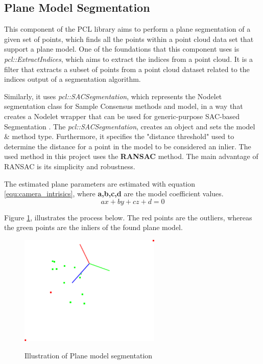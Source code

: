 \documentclass[12pt]{report}
\begin{document}
\subsection{Plane Model Segmentation}
\label{section:Plane Model Segmentation}
This component of the PCL library aims to perform a plane segmentation of a given set of points, which finds all the points within a point cloud data set that support a plane model.
One of the foundations that this component uses is \textit{pcl::ExtractIndices}, which aims to extract the indices from a point cloud.
It is a filter that extracts a subset of points from a point cloud dataset related to the indices output of a segmentation algorithm.

Similarly, it uses \textit{pcl::SACSegmentation}, which represents the Nodelet segmentation class for Sample Consensus methods and model, in a way that creates a Nodelet wrapper that can be used
for generic-purpose SAC-based Segmentation .
The \textit{pcl::SACSegmentation}, creates an object and sets the model \& method type. Furthermore, it specifies the "distance threshold" used to determine the distance for a point in the model to be considered an inlier.
The used method in this project uses the \textbf{RANSAC} method. The main advantage of RANSAC is its simplicity and robustness. 

The estimated plane parameters are estimated with equation \ref{equ:camera_intrisics}, where \textbf{a,b,c,d} are the model coefficient values.
\begin{equation}
  ax + by + cz + d = 0
\end{equation}
\label{equ:plane_param}

Figure \ref{fig:plane_seg}, illustrates the process below. The red points are the outliers, whereas the green points are the inliers of the found plane model.

\begin{figure}[H]%
  \centering
  \includegraphics[width=0.6\textwidth]{planar_segmentation_2.png}
 \caption{Illustration of Plane model segmentation}\cite[]{SHCHUROVA201576}
 \label{fig:plane_seg} 
\end{figure}
\end{document}
